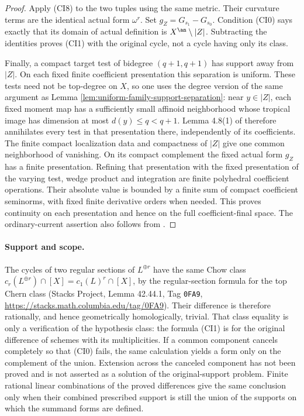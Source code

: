 \begin{proof}
Apply (CI8) to the two tuples using the same metric.  Their curvature
terms are the identical actual form $\omega^r$.  Set
$g_Z=G_{s_1}-G_{s_0}$.  Condition (CI0) says exactly that its domain of
actual definition is $X^{\an}\setminus|Z|$.  Subtracting the identities
proves (CI1) with the original cycle, not a cycle having only its class.

Finally, a compact target test of bidegree $(q+1,q+1)$ has support away
from $|Z|$.  On each fixed finite coefficient presentation this
separation is uniform.  These tests need not be top-degree on $X$,
so one uses the degree version of the same argument as Lemma
\ref{lem:uniform-family-support-separation}: near $y\in|Z|$, each
fixed moment map has a sufficiently small affinoid neighborhood whose
tropical image has dimension at most $d(y)\le q<q+1$.
Lemma 4.8(1) of \cite{Mih24} therefore annihilates every test in
that presentation there, independently of its coefficients.
The finite compact localization data and compactness of $|Z|$ give
one common neighborhood of vanishing.  On its compact complement
the fixed actual form $g_Z$ has a finite presentation.  Refining
that presentation with the fixed presentation of the varying test,
wedge product and integration are finite polyhedral coefficient
operations.  Their absolute value is bounded by a finite sum of compact
coefficient seminorms, with fixed finite derivative orders when needed.
This proves continuity on each presentation and hence on the full
coefficient-final space.  The ordinary-current assertion also follows
from \cite[Lemma 5.1]{Mih24}.
\end{proof}

\paragraph{Support and scope.}
The cycles of two regular sections of $L^{\oplus r}$ have the same
Chow class $c_r(L^{\oplus r})\cap[X]=c_1(L)^r\cap[X]$, by the
regular-section formula for the top Chern class (Stacks Project,
Lemma 42.44.1, Tag \texttt{0FA9},
\url{https://stacks.math.columbia.edu/tag/0FA9}).  Their difference is
therefore rationally, and hence geometrically homologically, trivial.
That class equality is only a verification of the hypothesis class:
the formula (CI1) is for the original difference of schemes with its
multiplicities.  If a common component cancels completely so that
(CI0) fails, the same calculation yields a form only on the complement
of the union.  Extension across the canceled component has not been
proved and is not asserted as a solution of the original-support problem.
Finite rational linear combinations of the proved differences give the
same conclusion only when their combined prescribed support is still
the union of the supports on which the summand forms are defined.

